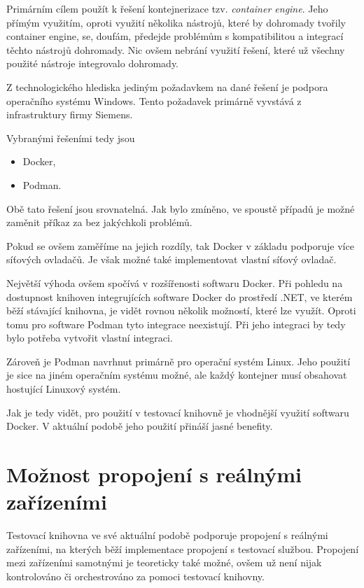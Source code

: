 Primárním cílem použít k řešení kontejnerizace tzv. \textit{container engine}. Jeho přímým využitím, oproti využití několika nástrojů, které by dohromady tvořily container engine, se, doufám, předejde problémům s kompatibilitou a integrací těchto nástrojů dohromady. Nic ovšem nebrání využití řešení, které už všechny použité nástroje integrovalo dohromady.

Z technologického hlediska jediným požadavkem na dané řešení je podpora operačního systému Windows. Tento požadavek primárně vyvstává z infrastruktury firmy Siemens. 

Vybranými řešeními tedy jsou

\begin{itemize}
    \item Docker,
    \item Podman.
\end{itemize}

Obě tato řešení jsou srovnatelná. Jak bylo zmíněno, ve spoustě případů je možné zaměnit příkaz  za  bez jakýchkoli problémů. 

Pokud se ovšem zaměříme na jejich rozdíly, tak Docker v základu podporuje více síťových ovladačů. Je však možné také implementovat vlastní síťový ovladač.\,\cite{docker_networking_overview}

Největší výhoda ovšem spočívá v rozšířenosti softwaru Docker. Při pohledu na dostupnost knihoven integrujících software Docker do prostředí .NET, ve kterém běží stávající knihovna, je vidět rovnou několik možností, které lze využít. Oproti tomu pro software Podman tyto integrace neexistují. Při jeho integraci by tedy bylo potřeba vytvořit vlastní integraci. 

Zároveň je Podman navrhnut primárně pro operační systém Linux. Jeho použití je sice na jiném operačním systému možné, ale každý kontejner musí obsahovat hostující Linuxový systém. 

Jak je tedy vidět, pro použití v testovací knihovně je vhodnější využití softwaru Docker. V aktuální podobě jeho použití přináší jasné benefity. 


\section{Možnost propojení s reálnými zařízeními}

Testovací knihovna ve své aktuální podobě podporuje propojení s reálnými zařízeními, na kterých běží implementace propojení s testovací službou. Propojení mezi zařízeními samotnými je teoreticky také možné, ovšem už není nijak kontrolováno či orchestrováno za pomoci testovací knihovny. 

